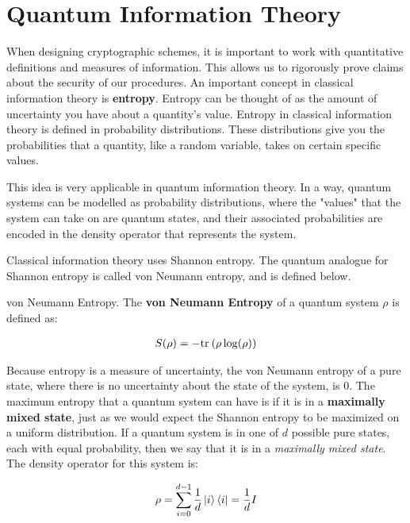 \section{Quantum Information Theory}
\label{section:qit}

When designing cryptographic schemes, it is important to work with quantitative definitions and measures of information. This allows us to rigorously prove claims about the security of our procedures. An important concept in classical information theory is \textbf{entropy}. Entropy can be thought of as the amount of uncertainty you have about a quantity's value. Entropy in classical information theory is defined in probability distributions. These distributions give you the probabilities that a quantity, like a random variable, takes on certain specific values.

This idea is very applicable in quantum information theory. In a way, quantum systems can be modelled as probability distributions, where the "values" that the system can take on are quantum states, and their associated probabilities are encoded in the density operator that represents the system.

Classical information theory uses Shannon entropy. The quantum analogue for Shannon entropy is called von Neumann entropy, and is defined below.

\begin{definition}{von Neumann Entropy.}
    The \textbf{von Neumann Entropy} of a quantum system $\rho$ is defined as:
    
    \begin{align}
        S(\rho) = -\text{tr}_{}\left( {\rho \log(\rho)} \right)
    \end{align}
\end{definition}

Because entropy is a measure of uncertainty, the von Neumann entropy of a pure state, where there is no uncertainty about the state of the system, is 0. The maximum entropy that a quantum system can have is if it is in a \textbf{maximally mixed state}, just as we would expect the Shannon entropy to be maximized on a uniform distribution. If a quantum system is in one of $d$ possible pure states, each with equal probability, then we say that it is in a \textit{maximally mixed state}. The density operator for this system is:

\begin{align}
    \rho = \sum_{i=0}^{d-1} \frac{1}{d}\ket{i}\bra{i} = \frac{1}{d} I
\end{align}

